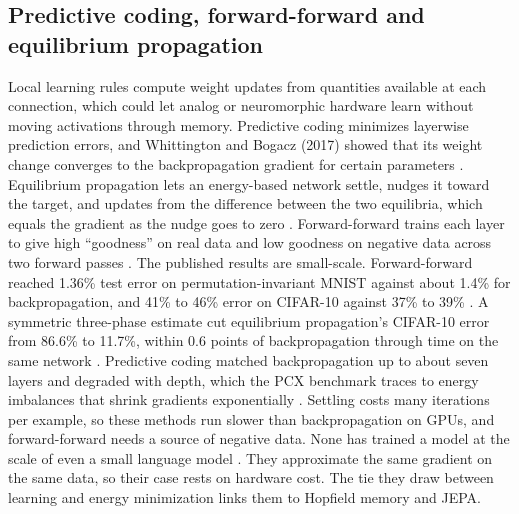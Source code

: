 \subsection{Predictive coding, forward-forward and equilibrium propagation}
Local learning rules compute weight updates from quantities available at each connection, which could let analog or neuromorphic hardware learn without moving activations through memory. Predictive coding minimizes layerwise prediction errors, and Whittington and Bogacz (2017) showed that its weight change converges to the backpropagation gradient for certain parameters \cite{post40}. Equilibrium propagation lets an energy-based network settle, nudges it toward the target, and updates from the difference between the two equilibria, which equals the gradient as the nudge goes to zero \cite{post41}. Forward-forward trains each layer to give high ``goodness'' on real data and low goodness on negative data across two forward passes \cite{post42}. The published results are small-scale. Forward-forward reached 1.36\% test error on permutation-invariant MNIST against about 1.4\% for backpropagation, and 41\% to 46\% error on CIFAR-10 against 37\% to 39\% \cite{post42}. A symmetric three-phase estimate cut equilibrium propagation's CIFAR-10 error from 86.6\% to 11.7\%, within 0.6 points of backpropagation through time on the same network \cite{post43}. Predictive coding matched backpropagation up to about seven layers and degraded with depth, which the PCX benchmark traces to energy imbalances that shrink gradients exponentially \cite{post44}. Settling costs many iterations per example, so these methods run slower than backpropagation on GPUs, and forward-forward needs a source of negative data. None has trained a model at the scale of even a small language model \cite{post43,post44}. They approximate the same gradient on the same data, so their case rests on hardware cost. The tie they draw between learning and energy minimization links them to Hopfield memory and JEPA.

